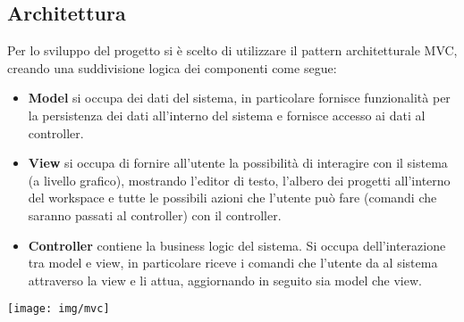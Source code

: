 \documentclass{article}
\begin{document}
  \subsection{Architettura}
  Per lo sviluppo del progetto si è scelto di utilizzare il pattern architetturale MVC, creando una suddivisione logica dei componenti come segue:
  \begin{itemize}
    \item \textbf{Model} si occupa dei dati del sistema, in particolare fornisce funzionalità per la persistenza dei dati all'interno del sistema e fornisce
    accesso ai dati al controller.
    \item \textbf{View} si occupa di fornire all'utente la possibilità di interagire con il sistema (a livello grafico), mostrando l'editor
    di testo, l'albero dei progetti all'interno del workspace e tutte le possibili azioni che l'utente può fare (comandi che saranno passati al controller)
    con il controller.
    \item \textbf{Controller} contiene la business logic del sistema. Si occupa dell'interazione tra model e view, in particolare riceve i comandi che l'utente da al sistema
    attraverso la view e li attua, aggiornando in seguito sia model che view.
  \end{itemize}
  \begin{framed}
    \centering
    \begin{center}
      \texttt{[image: img/mvc]}
    \end{center}
  \end{framed}
\end{document}

